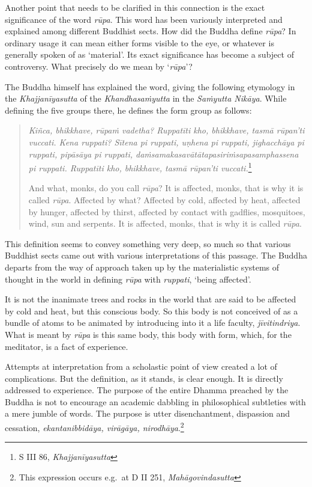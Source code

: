 Another point that needs to be clarified in this connection is the exact significance of the word \emph{rūpa}. This word has been variously interpreted and explained among different Buddhist sects. How did the Buddha define \emph{rūpa}? In ordinary usage it can mean either forms visible to the eye, or whatever is generally spoken of as `material'. Its exact significance has become a subject of controversy. What precisely do we mean by `\emph{rūpa}'?

The Buddha himself has explained the word, giving the following etymology in the \emph{Khajjanīyasutta} of the \emph{Khandhasaṁyutta} in the \emph{Saṁyutta Nikāya}. While defining the five groups there, he defines the form group as follows:

\begin{quote}
\emph{Kiñca, bhikkhave, rūpaṁ vadetha? Ruppatīti kho, bhikkhave, tasmā rūpan'ti vuccati. Kena ruppati? Sītena pi ruppati, uṇhena pi ruppati, jighacchāya pi ruppati, pipāsāya pi ruppati, daṁsamakasavātātapasiriṁsapasamphassena pi ruppati. Ruppatīti kho, bhikkhave, tasmā rūpan'ti vuccati.}\footnote{S III 86, \emph{Khajjanīyasutta}}

And what, monks, do you call \emph{rūpa}? It is affected, monks, that is why it is called \emph{rūpa}. Affected by what? Affected by cold, affected by heat, affected by hunger, affected by thirst, affected by contact with gadflies, mosquitoes, wind, sun and serpents. It is affected, monks, that is why it is called \emph{rūpa}.
\end{quote}

This definition seems to convey something very deep, so much so that various Buddhist sects came out with various interpretations of this passage. The Buddha departs from the way of approach taken up by the materialistic systems of thought in the world in defining \emph{rūpa} with \emph{ruppati}, `being affected'.

It is not the inanimate trees and rocks in the world that are said to be affected by cold and heat, but this conscious body. So this body is not conceived of as a bundle of atoms to be animated by introducing into it a life faculty, \emph{jīvitindriya}. What is meant by \emph{rūpa} is this same body, this body with form, which, for the meditator, is a fact of experience.

Attempts at interpretation from a scholastic point of view created a lot of complications. But the definition, as it stands, is clear enough. It is directly addressed to experience. The purpose of the entire Dhamma preached by the Buddha is not to encourage an academic dabbling in philosophical subtleties with a mere jumble of words. The purpose is utter disenchantment, dispassion and cessation, \emph{ekantanibbidāya, virāgāya, nirodhāya}.\footnote{This expression occurs e.g.~at D II 251, \emph{Mahāgovindasutta}}


